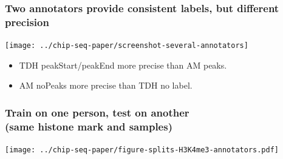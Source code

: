 \documentclass{beamer}
\begin{document}



\begin{frame}
  \frametitle{Two annotators provide consistent labels, but different
    precision}
  \texttt{[image: ../chip-seq-paper/screenshot-several-annotators]}

  \begin{itemize}
  \item TDH peakStart/peakEnd more precise than AM peaks.
  \item AM noPeaks more precise than TDH no label.
  \end{itemize}
\end{frame}

\begin{frame}
  \frametitle{Train on one person, test on another\\
(same histone mark and samples)}
  \texttt{[image: ../chip-seq-paper/figure-splits-H3K4me3-annotators.pdf]}
\end{frame}
\end{document}
